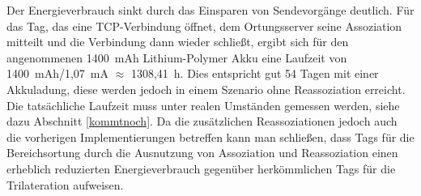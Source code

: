 Der Energieverbrauch sinkt durch das Einsparen von Sendevorgänge deutlich.
Für das Tag, das eine TCP-Verbindung öffnet, dem Ortungsserver seine Assoziation mitteilt und die Verbindung dann wieder schließt, ergibt sich für den angenommenen 1400\ mAh Lithium-Polymer Akku eine Laufzeit von 1400\ mAh/1,07\ mA $\approx$ 1308,41\ h. 
Dies entspricht gut 54 Tagen mit einer Akkuladung, diese werden jedoch in einem Szenario ohne Reassoziation erreicht.
Die tatsächliche Laufzeit muss unter realen Umständen gemessen werden, siehe dazu Abschnitt \ref{kommtnoch}.
Da die zusätzlichen Reassoziationen jedoch auch die vorherigen Implementierungen betreffen kann man schließen, dass Tags für die Bereichsortung durch die Ausnutzung von Assoziation und Reassoziation einen erheblich reduzierten Energieverbrauch gegenüber herkömmlichen Tags für die Trilateration aufweisen.




